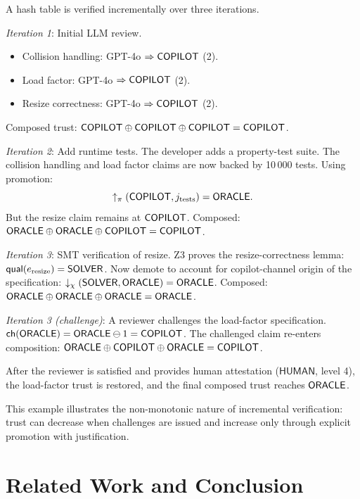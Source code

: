 \documentclass[11pt]{article}
\begin{document}
\begin{example}\label{ex:hashtable}
A hash table is verified incrementally over three iterations.

\emph{Iteration 1}: Initial LLM review.
\begin{itemize}[nosep]
  \item Collision handling: GPT-4o $\Rightarrow \mathsf{COPILOT}$ (2).
  \item Load factor: GPT-4o $\Rightarrow \mathsf{COPILOT}$ (2).
  \item Resize correctness: GPT-4o $\Rightarrow \mathsf{COPILOT}$ (2).
\end{itemize}
Composed trust: $\mathsf{COPILOT} \oplus \mathsf{COPILOT} \oplus \mathsf{COPILOT}
= \mathsf{COPILOT}$.

\emph{Iteration 2}: Add runtime tests.
The developer adds a property-test suite.  The collision
handling and load factor claims are now backed by 10\,000
tests.  Using promotion:
\[
  \uparrow_\pi(\mathsf{COPILOT}, j_{\text{tests}}) = \mathsf{ORACLE}.
\]
But the resize claim remains at $\mathsf{COPILOT}$.  Composed:
$\mathsf{ORACLE} \oplus \mathsf{ORACLE} \oplus \mathsf{COPILOT} = \mathsf{COPILOT}$.

\emph{Iteration 3}: SMT verification of resize.
Z3 proves the resize-correctness lemma:
$\mathsf{qual}(e_{\text{resize}}) = \mathsf{SOLVER}$.
Now demote to account for copilot-channel origin of the
specification: $\downarrow_\chi(\mathsf{SOLVER}, \mathsf{ORACLE}) = \mathsf{ORACLE}$.
Composed: $\mathsf{ORACLE} \oplus \mathsf{ORACLE} \oplus \mathsf{ORACLE} = \mathsf{ORACLE}$.

\emph{Iteration 3 (challenge)}: A reviewer challenges the
load-factor specification.
$\mathsf{ch}(\mathsf{ORACLE}) = \mathsf{ORACLE} \ominus 1 = \mathsf{COPILOT}$.
The challenged claim re-enters composition:
$\mathsf{ORACLE} \oplus \mathsf{COPILOT} \oplus \mathsf{ORACLE} = \mathsf{COPILOT}$.

After the reviewer is satisfied and provides human
attestation ($\mathsf{HUMAN}$, level 4), the load-factor
trust is restored, and the final composed trust reaches
$\mathsf{ORACLE}$.

This example illustrates the non-monotonic nature of
incremental verification: trust can decrease when challenges
are issued and increase only through explicit promotion with
justification.
\end{example}


\section{Related Work and Conclusion}\label{sec:related}
\end{document}
